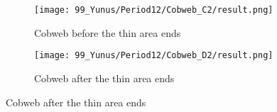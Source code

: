 \begin{figure}
    \centering
    \begin{subfigure}{0.4\textwidth}
        \centering
        \texttt{[image: 99\_Yunus/Period12/Cobweb\_C2/result.png]}
        \caption{Cobweb before the thin area ends}
        \label{fig:yunus.2pi.CobwebC2}
    \end{subfigure}
    \begin{subfigure}{0.4\textwidth}
        \centering
        \texttt{[image: 99\_Yunus/Period12/Cobweb\_D2/result.png]}
        \caption{Cobweb after the thin area ends}
        \label{fig:yunus.2pi.CobwebD2}
    \end{subfigure}
\end{figure}
